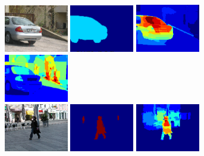 \documentclass{llncs} %
\begin{document}
\begin{figure}[tbp]
	\begin{center}
        \includegraphics[width=28mm]{images/car1_img.png}\hspace*{0.7ex}
        \includegraphics[width=28mm]{images/car1_gt.png}\hspace*{0.7ex}
        \includegraphics[width=28mm]{images/car1_pos.png}\hspace*{0.7ex}
        \includegraphics[width=28mm]{images/car1_neg.png}\hspace*{0.7ex}\\
        \vspace{1mm}
        \includegraphics[width=28mm]{images/person1_img.png}\hspace*{0.7ex}
        \includegraphics[width=28mm]{images/person1_gt.png}\hspace*{0.7ex}
        \includegraphics[width=28mm]{images/person1_pos.png}\hspace*{0.7ex}

\end{center}
\end{figure}
\end{document}
